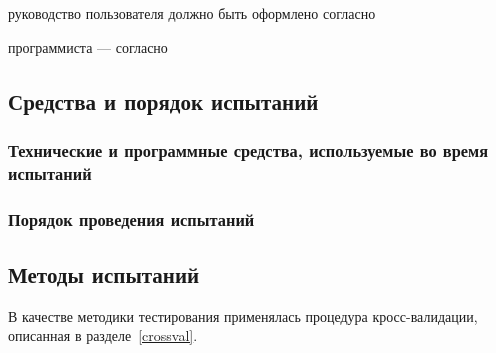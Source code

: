 руководство пользователя должно быть оформлено согласно~\cite{gost_19.505} 

программиста --- согласно~\cite{gost_19.504}  



\subsection{Средства и порядок испытаний}
\subsubsection{Технические и программные средства, используемые во время испытаний}



\subsubsection{Порядок проведения испытаний}


\subsection{Методы испытаний}\label{testing_methods}

В качестве методики тестирования применялась процедура кросс-валидации, описанная в разделе~\ref{crossval}.

